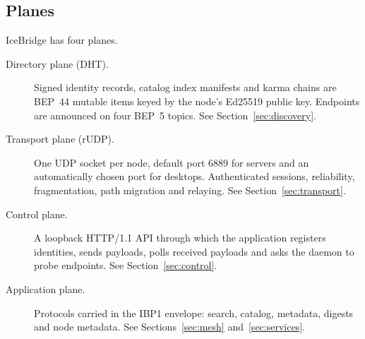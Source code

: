 \documentclass[11pt,a4paper]{article}
\DeclareRobustCommand{\_}{\origunderscore\allowbreak}
\begin{document}
\subsection{Planes}
IceBridge has four planes.
\begin{description}
\item[Directory plane (DHT).] Signed identity records, catalog index manifests and karma
  chains are BEP~44 mutable items keyed by the node's Ed25519 public key. Endpoints are
  announced on four BEP~5 topics. See Section~\ref{sec:discovery}.
\item[Transport plane (rUDP).] One UDP socket per node, default port 6889 for servers and
  an automatically chosen port for desktops. Authenticated sessions, reliability,
  fragmentation, path migration and relaying. See Section~\ref{sec:transport}.
\item[Control plane.] A loopback HTTP/1.1 API through which the application registers
  identities, sends payloads, polls received payloads and asks the daemon to probe
  endpoints. See Section~\ref{sec:control}.
\item[Application plane.] Protocols carried in the IBP1 envelope: search, catalog, metadata,
  digests and node metadata. See Sections~\ref{sec:mesh} and~\ref{sec:services}.
\end{description}
\end{document}
